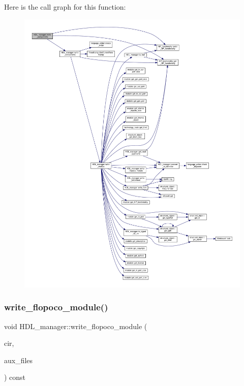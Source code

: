 Here is the call graph for this function\+:
\nopagebreak
\begin{figure}[H]
\begin{center}
\leavevmode
\includegraphics[width=350pt]{d7/d32/classHDL__manager_a0bc13e709384a03c49b4130be2035c92_cgraph}
\end{center}
\end{figure}
\mbox{\label{classHDL__manager_aea3affebb889f7cdfbcbf62a6473b9b2}} 
\subsubsection{\texorpdfstring{write\+\_\+flopoco\+\_\+module()}{write\_flopoco\_module()}}
{\footnotesize\ttfamily void H\+D\+L\+\_\+manager\+::write\+\_\+flopoco\+\_\+module (\begin{DoxyParamCaption}\item[{const \hyperlink{structural__objects_8hpp_a8ea5f8cc50ab8f4c31e2751074ff60b2}{structural\+\_\+object\+Ref} \&}]{cir,  }\item[{std\+::list$<$ std\+::string $>$ \&}]{aux\+\_\+files }\end{DoxyParamCaption}) const\hspace{0.3cm}{\ttfamily [private]}}



